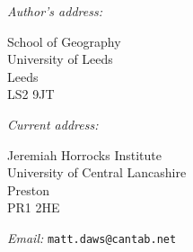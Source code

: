 \documentclass[twoside,a4paper,twocolumn,10pt]{article}
\theoremstyle{plain}
\theoremstyle{definition}
\begin{document}
\vspace{5ex}

\noindent\emph{Author's address:}
\parbox[t]{3in}{School of Geography\\
University of Leeds\\
Leeds\\
LS2 9JT}

\noindent\emph{Current address:}
\parbox[t]{3in}{Jeremiah Horrocks Institute\\
University of Central Lancashire\\
Preston\\
PR1 2HE}

\bigskip\noindent\emph{Email:} \texttt{matt.daws@cantab.net}
\end{document}
